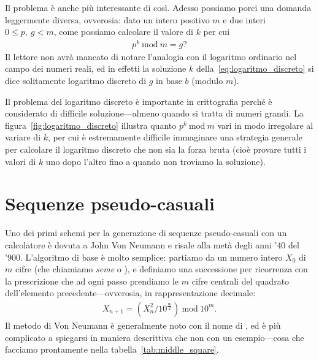 Il problema è anche più interessante di così. Adesso possiamo porci una
domanda leggermente diversa, ovverosia: dato un intero positivo $m$ e due interi
$0 \leq p,~g < m$, come possiamo calcolare il valore di $k$ per cui
\begin{align}\label{eq:logaritmo_discreto}
  p^k~\text{mod}~m = g?
\end{align}
Il lettore non avrà mancato di notare l'analogia con il logaritmo ordinario
nel campo dei numeri reali, ed in effetti la soluzione $k$
della~\eqref{eq:logaritmo_discreto} si dice solitamente logaritmo discreto di
$g$ in base $b$ (modulo $m$).


Il problema del logaritmo discreto è importante in crittografia
perché è considerato di difficile soluzione---almeno quando si tratta di
numeri grandi. La figura~\ref{fig:logaritmo_discreto} illustra quanto
$p^k~\text{mod}~m$ vari in modo irregolare al variare di $k$, per cui è
estremamente difficile immaginare una strategia generale per calcolare il
logaritmo discreto che non sia la forza bruta (cioè provare tutti i valori
di $k$ uno dopo l'altro fino a quando non troviamo la soluzione).


\section{Sequenze pseudo-casuali}

Uno dei primi schemi per la generazione di sequenze pseudo-casuali con un
calcolatore è dovuta a John Von Neumann e risale alla metà degli
anni '40 del '900. L'algoritmo di base è molto semplice: partiamo da un
numero intero $X_0$ di $m$ cifre (che chiamiamo \emph{seme} o ), e
definiamo una successione per ricorrenza con la prescrizione che ad ogni passo
prendiamo le $m$ cifre centrali del quadrato dell'elemento
precedente---ovverosia, in rappresentazione decimale:
\begin{align}\label{eq:middle_square}
  X_{n + 1} = (X_n^2 / 10^{\frac{m}{2}})~\text{mod}~10^m.
\end{align}
Il metodo di Von Neumann è generalmente noto con il nome di ,
ed è più complicato a spiegarsi in maniera descrittiva che non con un esempio---cosa
che facciamo prontamente nella tabella~\ref{tab:middle_square}.

